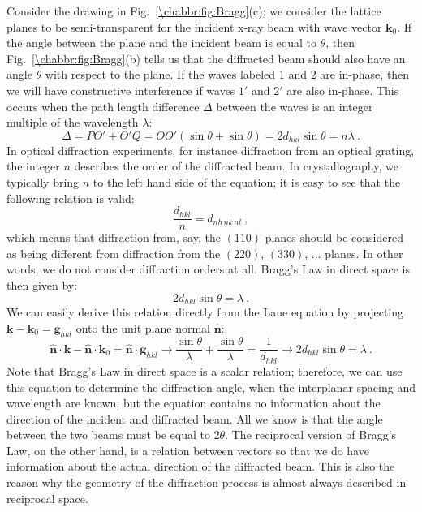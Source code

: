 Consider the drawing in Fig.~\ref{\chabbr:fig:Bragg}(c); we consider the lattice planes to be semi-transparent for the incident x-ray beam with wave vector $\mathbf{k}_0$. If the angle between the plane and the incident beam is equal to $\theta$, then Fig.~\ref{\chabbr:fig:Bragg}(b) tells us that the diffracted beam should also have an angle $\theta$ with respect to the plane.  If the waves labeled $1$ and $2$ are in-phase, then we will have constructive interference if waves $1'$ and $2'$ are also in-phase. This occurs when the path length difference $\Delta$ between the waves is an integer multiple of the wavelength $\lambda$:
\begin{equation}
	\Delta = PO'+O'Q = OO'(\sin\theta+\sin\theta) = 2d_{hkl}\sin\theta = n\lambda\ .\label{\chabbr:eq:Bragg1}
\end{equation}
In optical diffraction experiments, for instance diffraction from an optical grating, the integer $n$ describes the order of the diffracted beam.  In crystallography, we typically bring $n$ to the left hand side of the equation; it is easy to see that the following relation is valid:
\[
	\frac{d_{hkl}}{n}=d_{nh\,nk\,nl}\ ,
\]
which means that diffraction from, say, the $(110)$ planes should be considered as being different from diffraction from the $(220)$, $(330)$, $\ldots$ planes.  In other words, we do not consider diffraction orders at all.  Bragg's Law in direct space is then given by:
\begin{equation}
	2d_{hkl}\sin\theta = \lambda\ .\label{\chabbr:eq:Bragg2}
\end{equation}
We can easily derive this relation directly from the Laue equation by projecting $\mathbf{k}-\mathbf{k}_0=\mathbf{g}_{hkl}$ onto the unit plane normal $\hat{\mathbf{n}}$:
\[
	\hat{\mathbf{n}}\cdot\mathbf{k}-\hat{\mathbf{n}}\cdot\mathbf{k}_0=\hat{\mathbf{n}}\cdot\mathbf{g}_{hkl}\rightarrow \frac{\sin\theta}{\lambda}+\frac{\sin\theta}{\lambda}=\frac{1}{d_{hkl}}\rightarrow 2d_{hkl}\sin\theta = \lambda\ .
\]
Note that Bragg's Law in direct space is a scalar relation; therefore, we can use this equation to determine the diffraction angle, when the interplanar spacing and wavelength are known, but the equation contains no information about the direction of the incident and diffracted beam.  All we know is that the angle between the two beams must be equal to $2\theta$. The reciprocal version of Bragg's Law, on the other hand, is a relation between vectors so that we do have information about the actual direction of the diffracted beam.  This is also the reason why the geometry of the diffraction process is almost always described in reciprocal space.

